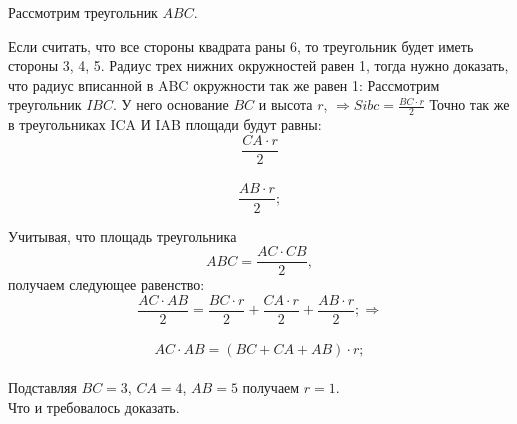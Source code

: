 \solutionSection

Рассмотрим треугольник $ABC$. 

Если считать, что все стороны квадрата раны 6, то треугольник будет иметь стороны 3, 4, 5. Радиус трех нижних окружностей равен 1, тогда нужно доказать, что радиус вписанной в ABC окружности так же равен 1: 
Рассмотрим треугольник $IBC$. У него основание $BC$ и высота $r$, $\Rightarrow Sibc =  \frac{BC \cdot r}{2}$
Точно так же в треугольниках ICA И IAB площади будут равны:
\begin{displaymath} 
\frac{CA \cdot r}{2} 
\end{displaymath}\\
\begin{displaymath} 
\frac{AB \cdot r}{2};
\end{displaymath}

Учитывая, что площадь треугольника \begin{displaymath}  ABC = \frac{AC \cdot CB}{2}, \end{displaymath} получаем следующее равенство: 
\begin{displaymath}
\frac{AC \cdot AB}{2} = \frac{BC \cdot r}{2} + \frac{CA \cdot r}{2} +  \frac{AB \cdot r}{2}; \Rightarrow 
\end{displaymath}\\
\begin{displaymath}
AC \cdot AB = (BC + CA + AB) \cdot r;
\end{displaymath}\\

Подставляя $BC=3$, $CA=4$, $AB=5$ получаем $r=1$.\\

Что и требовалось доказать.